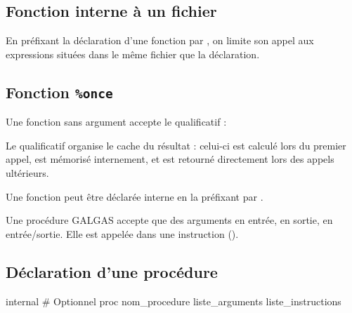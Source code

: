 \subsection{Fonction interne à un fichier}

En préfixant la déclaration d'une fonction par , on limite son appel aux expressions situées dans le même fichier que la déclaration.




\subsection{Fonction \texttt{\%once}}

Une fonction sans argument accepte le qualificatif  :


Le qualificatif  organise le cache du résultat : celui-ci est calculé lors du premier appel, est mémorisé internement, et est retourné directement lors des appels ultérieurs.

Une fonction  peut être déclarée interne en la préfixant par .







Une procédure GALGAS accepte que des arguments en entrée, en sortie, en entrée/sortie. Elle est appelée dans une instruction ().

\subsection{Déclaration d'une procédure}

\begin{galgascode}
internal # Optionnel
proc nom_procedure liste_arguments {
  liste_instructions
}
\end{galgascode}

